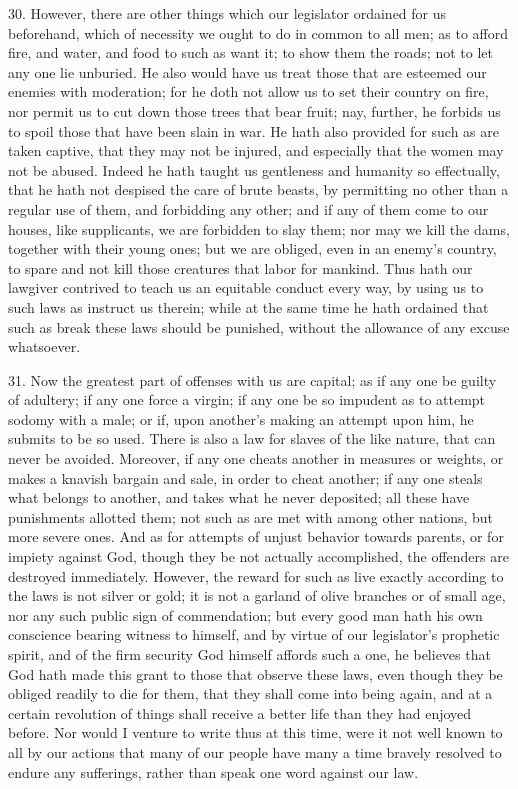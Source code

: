 30. However, there are other things which our legislator ordained for us
beforehand, which of necessity we ought to do in common to all men; as to
afford fire, and water, and food to such as want it; to show them the
roads; not to let any one lie unburied. He also would have us treat those
that are esteemed our enemies with moderation; for he doth not allow us to
set their country on fire, nor permit us to cut down those trees that bear
fruit; nay, further, he forbids us to spoil those that have been slain in
war. He hath also provided for such as are taken captive, that they may
not be injured, and especially that the women may not be abused. Indeed he
hath taught us gentleness and humanity so effectually, that he hath not
despised the care of brute beasts, by permitting no other than a regular
use of them, and forbidding any other; and if any of them come to our
houses, like supplicants, we are forbidden to slay them; nor may we kill
the dams, together with their young ones; but we are obliged, even in an
enemy's country, to spare and not kill those creatures that labor for
mankind. Thus hath our lawgiver contrived to teach us an equitable conduct
every way, by using us to such laws as instruct us therein; while at the
same time he hath ordained that such as break these laws should be
punished, without the allowance of any excuse whatsoever.

31. Now the greatest part of offenses with us are capital; as if any one
be guilty of adultery; if any one force a virgin; if any one be so
impudent as to attempt sodomy with a male; or if, upon another's making an
attempt upon him, he submits to be so used. There is also a law for slaves
of the like nature, that can never be avoided. Moreover, if any one cheats
another in measures or weights, or makes a knavish bargain and sale, in
order to cheat another; if any one steals what belongs to another, and
takes what he never deposited; all these have punishments allotted them;
not such as are met with among other nations, but more severe ones. And as
for attempts of unjust behavior towards parents, or for impiety against
God, though they be not actually accomplished, the offenders are destroyed
immediately. However, the reward for such as live exactly according to the
laws is not silver or gold; it is not a garland of olive branches or of
small age, nor any such public sign of commendation; but every good man
hath his own conscience bearing witness to himself, and by virtue of our
legislator's prophetic spirit, and of the firm security God himself
affords such a one, he believes that God hath made this grant to those
that observe these laws, even though they be obliged readily to die for
them, that they shall come into being again, and at a certain revolution
of things shall receive a better life than they had enjoyed before. Nor
would I venture to write thus at this time, were it not well known to all
by our actions that many of our people have many a time bravely resolved
to endure any sufferings, rather than speak one word against our law.

